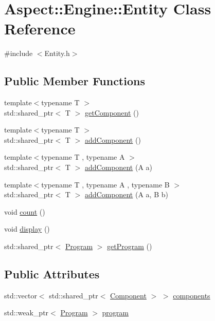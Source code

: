\hypertarget{class_aspect_1_1_engine_1_1_entity}{}\section{Aspect\+:\+:Engine\+:\+:Entity Class Reference}
\label{class_aspect_1_1_engine_1_1_entity}


{\ttfamily \#include $<$Entity.\+h$>$}

\subsection*{Public Member Functions}
\begin{DoxyCompactItemize}
\item 
{\footnotesize template$<$typename T $>$ }\\std\+::shared\+\_\+ptr$<$ T $>$ \mbox{\hyperlink{class_aspect_1_1_engine_1_1_entity_a5fdedcbe74684afa991dc83b6c7b96a1}{get\+Component}} ()
\item 
{\footnotesize template$<$typename T $>$ }\\std\+::shared\+\_\+ptr$<$ T $>$ \mbox{\hyperlink{class_aspect_1_1_engine_1_1_entity_ae7a087ed64f4fec3b61ff2cba098d19a}{add\+Component}} ()
\item 
{\footnotesize template$<$typename T , typename A $>$ }\\std\+::shared\+\_\+ptr$<$ T $>$ \mbox{\hyperlink{class_aspect_1_1_engine_1_1_entity_aac44f29e1ad32261d7853e59a7562671}{add\+Component}} (A a)
\item 
{\footnotesize template$<$typename T , typename A , typename B $>$ }\\std\+::shared\+\_\+ptr$<$ T $>$ \mbox{\hyperlink{class_aspect_1_1_engine_1_1_entity_a73a023e500fddd340cf843e6e11796dd}{add\+Component}} (A a, B b)
\item 
void \mbox{\hyperlink{class_aspect_1_1_engine_1_1_entity_ad3a033d6bbe1dfa9011e4f2d5ce8c928}{count}} ()
\item 
void \mbox{\hyperlink{class_aspect_1_1_engine_1_1_entity_ac889f58ccf361ce3ec1126f9df141679}{display}} ()
\item 
std\+::shared\+\_\+ptr$<$ \mbox{\hyperlink{class_aspect_1_1_engine_1_1_program}{Program}} $>$ \mbox{\hyperlink{class_aspect_1_1_engine_1_1_entity_a39566f856dd82efb948383c3037290a0}{get\+Program}} ()
\end{DoxyCompactItemize}
\subsection*{Public Attributes}
\begin{DoxyCompactItemize}
\item 
std\+::vector$<$ std\+::shared\+\_\+ptr$<$ \mbox{\hyperlink{class_aspect_1_1_engine_1_1_component}{Component}} $>$ $>$ \mbox{\hyperlink{class_aspect_1_1_engine_1_1_entity_ae7380f6b33ebbb9d4859a9de11549769}{components}}
\item 
std\+::weak\+\_\+ptr$<$ \mbox{\hyperlink{class_aspect_1_1_engine_1_1_program}{Program}} $>$ \mbox{\hyperlink{class_aspect_1_1_engine_1_1_entity_a39a0c787c384f192878e9c16f566b892}{program}}
\end{DoxyCompactItemize}


